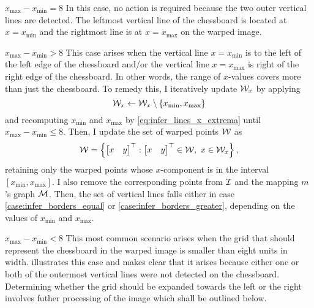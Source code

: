 \documentclass[../report.tex]{subfiles}
\begin{document}
\begin{caselist}
    \begin{case}{$x_\text{max}-x_\text{min}=8$}\label{case:infer_borders_equal}%
        In this case, no action is required because the two outer vertical lines are detected.
        The leftmost vertical line of the chessboard is located at $x=x_\text{min}$ and the rightmost line is at $x=x_\text{max}$ on the warped image.
    \end{case}

    \begin{case}{$x_\text{max}-x_\text{min}>8$}
        This case arises when the vertical line $x=x_\text{min}$ is to the left of the left edge of the chessboard and/or the vertical line $x=x_\text{max}$ is right of the right edge of the chessboard.
        In other words, the range of $x$-values covers more than just the chessboard.
        To remedy this, I iteratively update ${\mathcal{W}}_x$ by applying
        \begin{equation*}
            {\mathcal{W}}_x \gets {\mathcal{W}}_x \setminus \{x_\text{min},x_\text{max}\}
        \end{equation*}
        and recomputing $x_\text{min}$ and $x_\text{max}$ by \cref{eq:infer_lines_x_extrema}
        until $x_\text{max}-x_\text{min}\leq 8$.
        Then, I update the set of warped points ${\mathcal{W}}$ as
        \begin{equation*}
            {\mathcal{W}} = \left\{
                \begin{bmatrix}
                    x & y
                \end{bmatrix}^\top
                :
                \begin{bmatrix}
                    x & y
                \end{bmatrix}^\top
                \in {\mathcal{W}}, \ x \in {\mathcal{W}}_x
            \right\},
        \end{equation*}
        retaining only the warped points whose $x$-component is in the interval $[x_\text{min},x_\text{max}]$.
        I also remove the corresponding points from ${\mathcal{I}}$ and the mapping $m$'s graph ${\mathcal{M}}$.
        Then, the set of vertical lines falls either in case \ref{case:infer_borders_equal} or \ref{case:infer_borders_greater}, depending on the values of $x_\text{min}$ and $x_\text{max}$.
    \end{case}

    \begin{case}{$x_\text{max}-x_\text{min}<8$}\label{case:infer_borders_greater}%
        This most common scenario arises when the grid that should represent the chessboard in the warped image is smaller than eight units in width.
         illustrates this case and makes clear that it arises because either one or both of the outermost vertical lines were not detected on the chessboard. 
        Determining whether the grid should be expanded towards the left or the right involves futher processing of the image which shall be outlined below.
        

\end{case}
\end{caselist}
\end{document}
